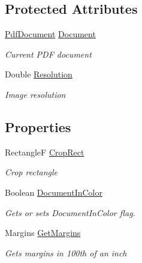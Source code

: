 \subsection*{Protected Attributes}
\begin{DoxyCompactItemize}
\item 
\hyperlink{class_pdf_file_writer_1_1_pdf_document}{Pdf\+Document} \hyperlink{class_pdf_file_writer_1_1_pdf_print_document_aedc2e1a562b0933d302df93071aa4bc8}{Document}
\begin{DoxyCompactList}\small\item\em Current P\+DF document \end{DoxyCompactList}\item 
Double \hyperlink{class_pdf_file_writer_1_1_pdf_print_document_a6597d5ffcf16bdcac7f7551b0c1be9b3}{Resolution}
\begin{DoxyCompactList}\small\item\em Image resolution \end{DoxyCompactList}\end{DoxyCompactItemize}
\subsection*{Properties}
\begin{DoxyCompactItemize}
\item 
RectangleF \hyperlink{class_pdf_file_writer_1_1_pdf_print_document_ac82c4ca7b2fb84417c42096c78e67cbe}{Crop\+Rect}
\begin{DoxyCompactList}\small\item\em Crop rectangle \end{DoxyCompactList}\item 
Boolean \hyperlink{class_pdf_file_writer_1_1_pdf_print_document_a9a1890a59a82d20315fc5806558ed17c}{Document\+In\+Color}\hypertarget{class_pdf_file_writer_1_1_pdf_print_document_a9a1890a59a82d20315fc5806558ed17c}{}\label{class_pdf_file_writer_1_1_pdf_print_document_a9a1890a59a82d20315fc5806558ed17c}

\begin{DoxyCompactList}\small\item\em Gets or sets Document\+In\+Color flag. \end{DoxyCompactList}\item 
Margins \hyperlink{class_pdf_file_writer_1_1_pdf_print_document_a108470bbd07939ed46c322041c3788de}{Get\+Margins}\hypertarget{class_pdf_file_writer_1_1_pdf_print_document_a108470bbd07939ed46c322041c3788de}{}\label{class_pdf_file_writer_1_1_pdf_print_document_a108470bbd07939ed46c322041c3788de}

\begin{DoxyCompactList}\small\item\em Gets margins in 100th of an inch \end{DoxyCompactList}\end{DoxyCompactItemize}



